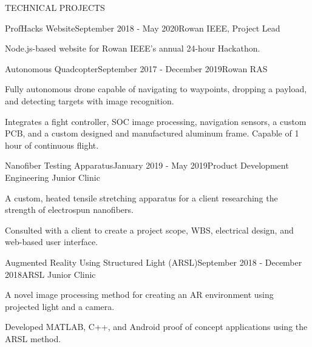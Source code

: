 \documentclass{article}
\begin{document}
\begin{rSection}{TECHNICAL PROJECTS}

  \begin{rSubsection}{ProfHacks Website}{September 2018 - May 2020}{Rowan IEEE, Project Lead}{}
  \item Node.js-based website for Rowan IEEE's annual 24-hour Hackathon.
  \end{rSubsection}


  \begin{rSubsection}{Autonomous Quadcopter}{September 2017 - December 2019}{Rowan
    RAS}{}
  \item Fully autonomous drone capable of navigating to waypoints, dropping a
    payload, and detecting targets with image recognition.
  \item Integrates a fight controller, SOC image processing, navigation sensors,
    a custom PCB, and a custom designed and manufactured aluminum frame. Capable
    of 1 hour of continuous flight.
  \end{rSubsection}


  \begin{rSubsection}{Nanofiber Testing Apparatus}{January 2019 - May 2019}{Product Development Engineering Junior Clinic}{}
  \item A custom, heated tensile stretching apparatus for a client researching the strength of electrospun nanofibers.
  \item Consulted with a client to create a project scope, WBS, electrical
    design, and web-based user interface.
  \end{rSubsection}


  \begin{rSubsection}{Augmented Reality Using Structured Light (ARSL)}{September
    2018 - December 2018}{ARSL Junior Clinic}{}
  \item A novel image processing method for creating an AR environment using projected light and a camera.
  \item Developed MATLAB, C++, and Android proof of concept applications using the
    ARSL method.
  \end{rSubsection}



\end{rSection}
\end{document}
